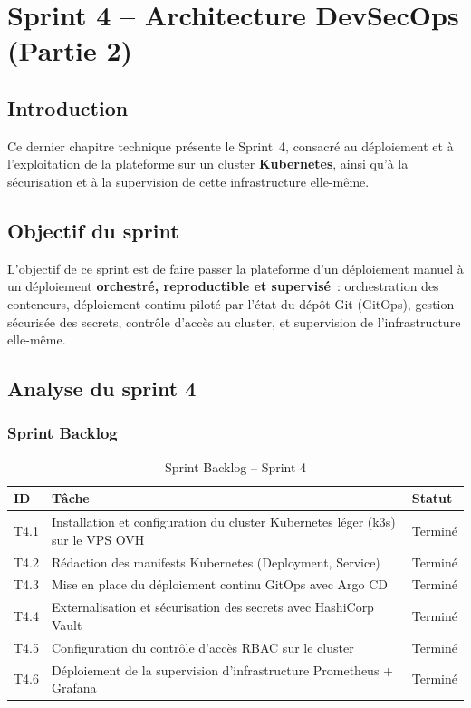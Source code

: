\chapter{Sprint 4 -- Architecture DevSecOps (Partie 2)}
\label{chap-sprint4}

\section*{Introduction}

Ce dernier chapitre technique présente le Sprint~4, consacré au déploiement et à l'exploitation de la plateforme sur un cluster \textbf{Kubernetes}, ainsi qu'à la sécurisation et à la supervision de cette infrastructure elle-même.

\section{Objectif du sprint}

L'objectif de ce sprint est de faire passer la plateforme d'un déploiement manuel à un déploiement \textbf{orchestré, reproductible et supervisé}~: orchestration des conteneurs, déploiement continu piloté par l'état du dépôt Git (GitOps), gestion sécurisée des secrets, contrôle d'accès au cluster, et supervision de l'infrastructure elle-même.

\section{Analyse du sprint 4}

\subsection{Sprint Backlog}

\begin{table}[H]
\centering
\caption{Sprint Backlog -- Sprint 4}
\small
\begin{tabularx}{\linewidth}{@{}p{1.3cm}Xl@{}}
\toprule
\textbf{ID} & \textbf{Tâche} & \textbf{Statut} \\
\midrule
T4.1 & Installation et configuration du cluster Kubernetes léger (k3s) sur le VPS OVH & Terminé \\
T4.2 & Rédaction des manifests Kubernetes (Deployment, Service) & Terminé \\
T4.3 & Mise en place du déploiement continu GitOps avec Argo CD & Terminé \\
T4.4 & Externalisation et sécurisation des secrets avec HashiCorp Vault & Terminé \\
T4.5 & Configuration du contrôle d'accès RBAC sur le cluster & Terminé \\
T4.6 & Déploiement de la supervision d'infrastructure Prometheus + Grafana & Terminé \\
\bottomrule
\end{tabularx}
\end{table}

